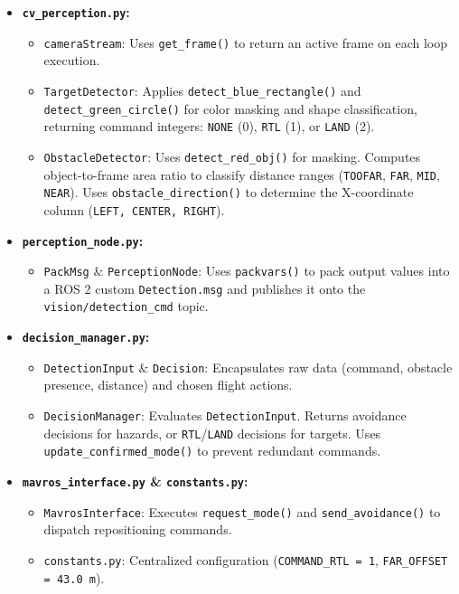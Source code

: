 \documentclass[11pt,a4paper]{article}
\begin{document}
\begin{itemize}
    \setlength\itemsep{0em}
    \item \textbf{\texttt{cv\_perception.py}:}
    \begin{itemize}
        \item \texttt{cameraStream}: Uses \texttt{get\_frame()} to return an active frame on each loop execution.
        \item \texttt{TargetDetector}: Applies \texttt{detect\_blue\_rectangle()} and \texttt{detect\_green\_circle()} for color masking and shape classification, returning command integers: \texttt{NONE} (0), \texttt{RTL} (1), or \texttt{LAND} (2).
        \item \texttt{ObstacleDetector}: Uses \texttt{detect\_red\_obj()} for masking. Computes object-to-frame area ratio to classify distance ranges (\texttt{TOOFAR}, \texttt{FAR}, \texttt{MID}, \texttt{NEAR}). Uses \texttt{obstacle\_direction()} to determine the X-coordinate column (\texttt{LEFT, CENTER, RIGHT}).
    \end{itemize}

    \item \textbf{\texttt{perception\_node.py}:}
    \begin{itemize}
        \item \texttt{PackMsg} \& \texttt{PerceptionNode}: Uses \texttt{packvars()} to pack output values into a ROS 2 custom \texttt{Detection.msg} and publishes it onto the \texttt{vision/detection\_cmd} topic.
    \end{itemize}

    \item \textbf{\texttt{decision\_manager.py}:}
    \begin{itemize}
        \item \texttt{DetectionInput} \& \texttt{Decision}: Encapsulates raw data (command, obstacle presence, distance) and chosen flight actions.
        \item \texttt{DecisionManager}: Evaluates \texttt{DetectionInput}. Returns avoidance decisions for hazards, or \texttt{RTL}/\texttt{LAND} decisions for targets. Uses \texttt{update\_confirmed\_mode()} to prevent redundant commands.
    \end{itemize}

    \item \textbf{\texttt{mavros\_interface.py} \& \texttt{constants.py}:}
    \begin{itemize}
        \item \texttt{MavrosInterface}: Executes \texttt{request\_mode()} and \texttt{send\_avoidance()} to dispatch repositioning commands.
        \item \texttt{constants.py}: Centralized configuration (\texttt{COMMAND\_RTL = 1}, \texttt{FAR\_OFFSET = 43.0\,m}).
    \end{itemize}
\end{itemize}
\end{document}
